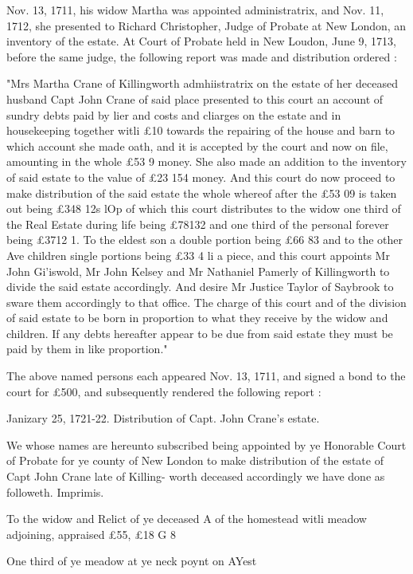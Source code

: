 Nov. 13, 1711, his widow Martha was appointed administratrix, 
and Nov. 11, 1712, she presented to Richard Christopher, Judge 
of Probate at New London, an inventory of the estate. At Court 
of Probate held in New Loudon, June 9, 1713, before the same 
judge, the following report was made and distribution ordered : 

"Mrs Martha Crane of Killingworth admhiistratrix on the estate of 
her deceased husband Capt John Crane of said place presented to this 
court an account of sundry debts paid by lier and costs and cliarges on 
the estate and in housekeeping together witli £10 towards the repairing 
of the house and barn to which account she made oath, and it is accepted 
by the court and now on file, amounting in the whole £53   9 money. 
She also made an addition to the inventory of said estate to the value of 
£23  154 money. And this court do now proceed to make distribution 
of the said estate the whole whereof after the £53  09 is taken out 
being £348  12s  lOp of which this court distributes to the widow one 
third of the Real Estate during life being £78132 and one third of the 
personal forever being £3712  1. To the eldest son a double portion 
being £66  83 and to the other Ave children single portions being 
£33 4 li a piece, and this court appoints Mr John Gi'iswold, Mr John 
Kelsey and Mr Nathaniel Pamerly of Killingworth to divide the said 
estate accordingly. And desire Mr Justice Taylor of Saybrook to sware 
them accordingly to that office. The charge of this court and of the 
division of said estate to be born in proportion to what they receive by 
the widow and children. If any debts hereafter appear to be due from 
said estate they must be paid by them in like proportion." 

The above named persons each appeared Nov. 13, 1711, and 
signed a bond to the court for £500, and subsequently rendered 
the following report : 

Janizary 25, 1721-22. Distribution of Capt. John Crane's 
estate. 

We whose names are hereunto subscribed being appointed by 
ye Honorable Court of Probate for ye county of New London to 
make distribution of the estate of Capt John Crane late of Killing- 
worth deceased accordingly we have done as followeth. 
Imprimis. 

To the widow and Relict of ye deceased A of the 
homestead witli meadow adjoining, appraised 
£55, £18 G 8 

One third of ye meadow at ye neck poynt on AYest 

